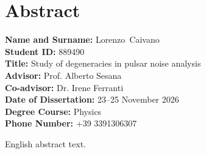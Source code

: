 \documentclass[12pt]{report}
\newcommand{\surnameEN}{Caivano}
\newcommand{\nameEN}{Lorenzo}
\newcommand{\matricolaEN}{889490}
\newcommand{\thesisTitleEN}{Study of degeneracies in pulsar noise analysis}
\newcommand{\advisorEN}{Prof. Alberto Sesana}
\newcommand{\coadvisorEN}{Dr. Irene Ferranti}
\newcommand{\defenseDateEN}{23--25 November 2026}
\newcommand{\degreeCourseEN}{Physics}
\newcommand{\phoneEN}{+39 3391306307}
\begin{document}
\newpage
\chapter*{Abstract}
\begin{center}
\textbf{Name and Surname:} \nameEN \, \surnameEN \\[0.3cm]
\textbf{Student ID:} \matricolaEN \\[0.3cm]
\textbf{Title:} \thesisTitleEN \\[0.3cm]
\textbf{Advisor:} \advisorEN \\[0.3cm]
\textbf{Co-advisor:} \coadvisorEN \\[0.3cm]
\textbf{Date of Dissertation:} \defenseDateEN \\[0.3cm]
\textbf{Degree Course:} \degreeCourseEN \\[0.3cm]
\textbf{Phone Number:} \phoneEN \\
\vspace{1cm}
\end{center}
\sloppy

\noindent
English abstract text. \par
\end{document}
